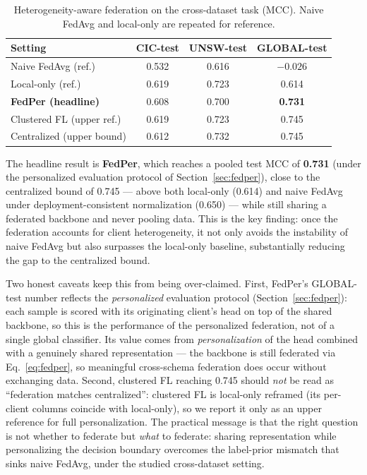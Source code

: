 \documentclass[11pt,a4paper]{article}
\begin{document}
\begin{table}[htbp]
\centering\small
\caption{Heterogeneity-aware federation on the cross-dataset task (MCC). Naive
FedAvg and local-only are repeated for reference.}
\label{tab:mitig}
\begin{tabular}{@{}lccc@{}}
\toprule
Setting & CIC-test & UNSW-test & GLOBAL-test \\
\midrule
Naive FedAvg (ref.)      & 0.532 & 0.616 & $-0.026$ \\
Local-only (ref.)        & 0.619 & 0.723 & 0.614 \\
\textbf{FedPer (headline)} & 0.608 & 0.700 & \textbf{0.731} \\
Clustered FL (upper ref.)& 0.619 & 0.723 & 0.745 \\
Centralized (upper bound)& 0.612 & 0.732 & 0.745 \\
\bottomrule
\end{tabular}
\end{table}

The headline result is \textbf{FedPer}, which reaches a pooled test MCC of
\textbf{0.731} (under the personalized evaluation protocol of
Section~\ref{sec:fedper}), close to the centralized bound of 0.745 --- above both
local-only (0.614) and naive FedAvg under deployment-consistent normalization
(0.650) --- while still sharing a federated backbone and never pooling data. This
is the key finding: once the federation accounts for client heterogeneity, it not
only avoids the instability of naive FedAvg but also surpasses the local-only
baseline, substantially reducing the gap to the centralized bound.

Two honest caveats keep this from being over-claimed. First, FedPer's GLOBAL-test
number reflects the \emph{personalized} evaluation protocol
(Section~\ref{sec:fedper}): each sample is scored with its originating client's
head on top of the shared backbone, so this is the performance of the personalized
federation, not of a single global classifier. Its value comes from
\emph{personalization} of the head combined with a genuinely shared representation
--- the backbone is still federated via Eq.~\ref{eq:fedper}, so meaningful
cross-schema federation does occur without exchanging data. Second, clustered FL
reaching 0.745 should \emph{not} be read as ``federation matches centralized'':
clustered FL is local-only reframed (its per-client columns coincide with
local-only), so we report it only as an upper reference for full personalization.
The practical message is that the right question is not whether to federate but
\emph{what} to federate: sharing representation while personalizing the decision
boundary overcomes the label-prior mismatch that sinks naive FedAvg, under the
studied cross-dataset setting.
\end{document}
